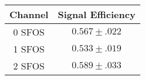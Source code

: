 \begin{tabular}{|c||c|}
\hline
Channel & Signal Efficiency \\
\hline\hline
0 SFOS &  $0.567 \pm .022$ \\
1 SFOS &  $0.533 \pm .019$ \\
2 SFOS &  $0.589 \pm .033$ \\
\hline
\end{tabular}
